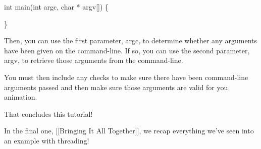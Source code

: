 \begin{DoxyCode}
\textcolor{keywordtype}{int} main(\textcolor{keywordtype}{int} argc, \textcolor{keywordtype}{char} * argv[]) \{

\}
\end{DoxyCode}


Then, you can use the first parameter, {\ttfamily argc}, to determine whether any arguments have been given on the command-\/line. If so, you can use the second parameter, {\ttfamily argv}, to retrieve those arguments from the command-\/line.

You must then include any checks to make sure there have been command-\/line arguments passed and then make sure those arguments are valid for you animation.

That concludes this tutorial!

In the final one, \mbox{[}\mbox{[}Bringing It All Together\mbox{]}\mbox{]}, we recap everything we've seen into an example with threading! 